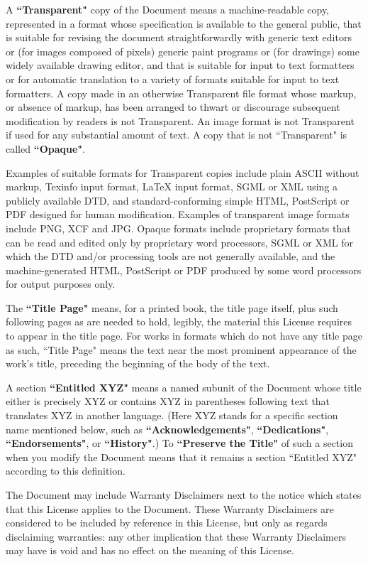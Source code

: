 \documentclass[12pt]{book}
\numberwithin{exc}{section}
\numberwithin{figure}{section}
\numberwithin{equation}{theorem}
\begin{document}
A \textbf{``Transparent"} copy of the Document means a machine-readable copy,
represented in a format whose specification is available to the
general public, that is suitable for revising the document
straightforwardly with generic text editors or (for images composed of
pixels) generic paint programs or (for drawings) some widely available
drawing editor, and that is suitable for input to text formatters or
for automatic translation to a variety of formats suitable for input
to text formatters.  A copy made in an otherwise Transparent file
format whose markup, or absence of markup, has been arranged to thwart
or discourage subsequent modification by readers is not Transparent.
An image format is not Transparent if used for any substantial amount
of text.  A copy that is not ``Transparent" is called \textbf{``Opaque"}.

Examples of suitable formats for Transparent copies include plain
ASCII without markup, Texinfo input format, LaTeX input format, SGML
or XML using a publicly available DTD, and standard-conforming simple
HTML, PostScript or PDF designed for human modification.  Examples of
transparent image formats include PNG, XCF and JPG.  Opaque formats
include proprietary formats that can be read and edited only by
proprietary word processors, SGML or XML for which the DTD and/or
processing tools are not generally available, and the
machine-generated HTML, PostScript or PDF produced by some word
processors for output purposes only.

The \textbf{``Title Page"} means, for a printed book, the title page itself,
plus such following pages as are needed to hold, legibly, the material
this License requires to appear in the title page.  For works in
formats which do not have any title page as such, ``Title Page" means
the text near the most prominent appearance of the work's title,
preceding the beginning of the body of the text.

A section \textbf{``Entitled XYZ"} means a named subunit of the Document whose
title either is precisely XYZ or contains XYZ in parentheses following
text that translates XYZ in another language.  (Here XYZ stands for a
specific section name mentioned below, such as \textbf{``Acknowledgements"},
\textbf{``Dedications"}, \textbf{``Endorsements"}, or \textbf{``History"}.)  
To \textbf{``Preserve the Title"}
of such a section when you modify the Document means that it remains a
section ``Entitled XYZ" according to this definition.

The Document may include Warranty Disclaimers next to the notice which
states that this License applies to the Document.  These Warranty
Disclaimers are considered to be included by reference in this
License, but only as regards disclaiming warranties: any other
implication that these Warranty Disclaimers may have is void and has
no effect on the meaning of this License.
\end{document}

